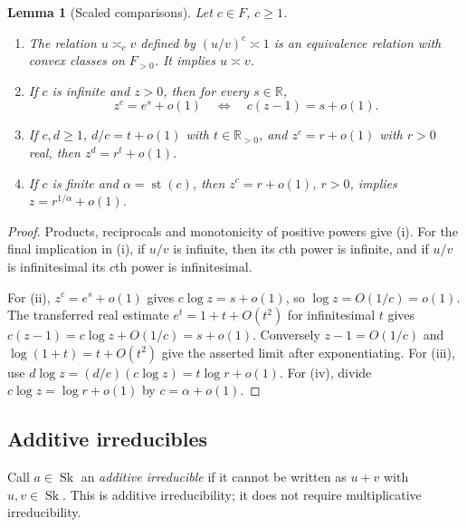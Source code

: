\documentclass[11pt]{article}
\newtheorem{lemma}[theorem]{Lemma}
\theoremstyle{definition}
\theoremstyle{remark}
\newcommand{\Sk}{\operatorname{Sk}}
\newcommand{\R}{\mathbb R}
\newcommand{\st}{\operatorname{st}}
\newcommand{\arch}{\mathrel{\asymp}}
\numberwithin{equation}{section}
\begin{document}
\begin{lemma}[Scaled comparisons]\label{sf:lem:scaled}
Let $c\in F$, $c\ge1$.
\begin{enumerate}[label=\textup{(\roman*)},leftmargin=2.5em]
\item The relation $u\arch_c v$ defined by $(u/v)^c\arch1$ is
an equivalence relation with convex classes on $F_{>0}$. It implies
$u\arch v$.
\item If $c$ is infinite and $z>0$, then for every $s\in\R$,
\[
 z^c=e^s+o(1)\quad\Longleftrightarrow\quad
 c(z-1)=s+o(1).
\]
\item If $c,d\ge1$, $d/c=t+o(1)$ with $t\in\R_{>0}$, and
$z^c=r+o(1)$ with $r>0$ real, then $z^d=r^t+o(1)$.
\item If $c$ is finite and $\alpha=\st(c)$, then
$z^c=r+o(1)$, $r>0$, implies $z=r^{1/\alpha}+o(1)$.
\end{enumerate}
\end{lemma}
\begin{proof}
Products, reciprocals and monotonicity of positive powers give (i).
For the final implication in (i), if $u/v$ is infinite, then its
$c$th power is infinite, and if $u/v$ is infinitesimal its $c$th
power is infinitesimal.

For (ii), $z^c=e^s+o(1)$ gives $c\log z=s+o(1)$, so
$\log z=O(1/c)=o(1)$. The transferred real estimate
$e^t=1+t+O(t^2)$ for infinitesimal $t$ gives
$c(z-1)=c\log z+O(1/c)=s+o(1)$. Conversely
$z-1=O(1/c)$ and $\log(1+t)=t+O(t^2)$ give the asserted
limit after exponentiating. For (iii), use
$d\log z=(d/c)(c\log z)=t\log r+o(1)$.
For (iv), divide $c\log z=\log r+o(1)$ by $c=\alpha+o(1)$.
\end{proof}

\subsection{Additive irreducibles}

Call $a\in\Sk$ an \emph{additive irreducible} if it cannot be written
as $u+v$ with $u,v\in\Sk$. This is additive irreducibility; it
does not require multiplicative irreducibility.
\end{document}
